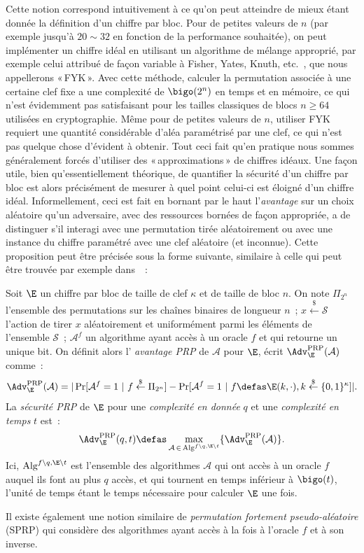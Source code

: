 Cette notion correspond intuitivement à ce qu'on peut atteindre de mieux étant donnée la définition d'un chiffre par bloc.
Pour de petites valeurs de $n$ (par exemple jusqu'à $20 \sim 32$ en fonction de la performance souhaitée), on peut
implémenter un chiffre idéal en utilisant un algorithme de mélange approprié, par exemple celui attribué de façon
variable à Fisher, Yates, Knuth, etc.~\cite{uniform_shuffle}, que nous appellerons «\,FYK\,».
Avec cette méthode, calculer la permutation associée à une certaine clef fixe a une complexité de
$\bigo(2^n)$ en temps et en mémoire, ce qui n'est
évidemment pas satisfaisant pour les tailles classiques de blocs $n \geq 64$ utilisées en cryptographie.
Même pour de petites valeurs de $n$, utiliser FYK requiert une quantité considérable d'aléa paramétrisé par une clef,
ce qui n'est pas quelque chose d'évident à obtenir. 
Tout ceci fait qu'en pratique nous sommes généralement forcés d'utiliser des «\,approximations\,» de chiffres idéaux.
Une façon utile, bien qu'essentiellement théorique, de quantifier la sécurité d'un chiffre par bloc est alors précisément
de mesurer à quel point celui-ci est éloigné d'un chiffre idéal.
Informellement, ceci est fait en bornant par le haut l'\emph{avantage} sur un choix aléatoire qu'un adversaire,
avec des ressources bornées de façon appropriée, a de distinguer s'il interagi avec une permutation tirée aléatoirement
ou avec une instance du chiffre paramétré avec une clef aléatoire (et inconnue). Cette proposition peut être précisée
sous la forme suivante, similaire à celle qui peut être trouvée par exemple dans~\cite{DBLP:journals/jcss/BellareKR00}~:

\begin{fdefi}
Soit $\E$ un chiffre par bloc de taille de clef $\kappa$ et de taille de bloc $n$.
On note 
$\Pi_{2^n}$ l'ensemble des permutations sur les chaînes binaires de longueur $n$~; $x \overset{\$}{\leftarrow} \mathcal{S}$
l'action de tirer $x$ aléatoirement et uniformément parmi les éléments de l'ensemble $\mathcal{S}$~; $\mathcal{A}^{f}$
un algorithme ayant accès à un oracle $f$ et qui retourne un unique bit.
On définit alors 
l' \emph{avantage PRP} de $\mathcal{A}$ pour $\E$, écrit $\Adv^{\text{PRP}}_{\E}(\mathcal{A})$ comme~:
\[
\Adv^{\text{PRP}}_{\E}(\mathcal{A}) = |\Pr[\mathcal{A}^f = 1~|~f \overset{\$}{\leftarrow} \Pi_{2^n}] - \Pr[\mathcal{A}^f = 1~|~f \defas \E(k,\cdot), k \overset{\$}{\leftarrow} \{0,1\}^\kappa]|.
\]
La \emph{sécurité PRP} de $\E$ pour une \emph{complexité en donnée} $q$ et une \emph{complexité en temps} $t$ est~:
\[
\Adv^{\text{PRP}}_{\E}(q,t) \defas \max_{\mathcal{A}\,\in\,\text{Alg}^{f\backslash q, \E\backslash t}} \{\Adv^{\text{PRP}}_{\E}(\mathcal{A})\}.
\]
Ici, 
$\text{Alg}^{f\backslash q, \E\backslash t}$ est l'ensemble des algorithmes $\mathcal{A}$ qui ont accès à un oracle $f$ auquel ils font au plus $q$ accès,
et qui tournent en temps inférieur à
$\bigo(t)$, l'unité de temps étant le temps nécessaire pour calculer $\E$ une fois.
\label{def:fprp}
\end{fdefi}
Il existe également une notion similaire de \emph{permutation fortement pseudo-aléatoire} (SPRP) qui considère des algorithmes ayant accès à la fois à l'oracle $f$ et à son inverse.

